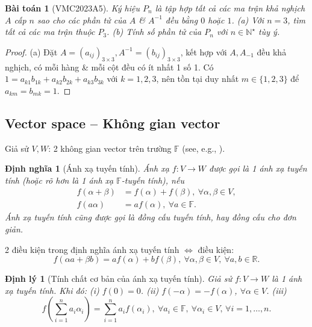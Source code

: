 \documentclass{article}
\newtheorem{baitoan}{Bài toán}
\newtheorem{dinhly}{Định lý}
\newtheorem{dinhnghia}{Định nghĩa}
\begin{document}
\begin{baitoan}[VMC2023A5]
	Ký hiệu $P_n$ là tập hợp tất cả các ma trận khả nghịch $A$ cấp $n$ sao cho các phần tử của $A$ \& $A^{-1}$ đều bằng $0$ hoặc $1$. (a) Với $n = 3$, tìm tất cả các ma trận thuộc $P_3$. (b) Tính số phần tử của $P_n$ với $n\in\mathbb{N}^\star$ tùy ý.
\end{baitoan}

\begin{proof}
	(a) Đặt $A = (a_{ij})_{3\times3},A^{-1} = (b_{ij})_{3\times3}$, kết hợp với $A,A_{-1}$ đều khả nghịch, có mỗi hàng \& mỗi cột đều có ít nhất 1 số 1. Có $1 = a_{k1}b_{1k} + a_{k2}b_{2k} + a_{k3}b_{3k}$ với $k = 1,2,3$, nên tồn tại duy nhất $m\in\{1,2,3\}$ để $a_{km} = b_{mk} = 1$.
\end{proof}


\subsection{Vector space -- Không gian vector}
Giả sử $V,W$: 2 không gian vector trên trường $\mathbb{F}$ (see, e.g., \cite[Chap. 2, \S2: Ánh xạ tuyến tính, pp. 100--110]{Hung_linear_algebra}).

\begin{dinhnghia}[Ánh xạ tuyến tính]
	Ánh xạ $f:V\to W$ được gọi là 1 \emph{ánh xạ tuyến tính} (hoặc rõ hơn là 1 \emph{ánh xạ $\mathbb{F}$-tuyến tính}), nếu
	\begin{align}
		f(\alpha + \beta) &= f(\alpha) + f(\beta),\ \forall\alpha,\beta\in V,\\
		f(a\alpha) &= af(\alpha),\ \forall a\in\mathbb{F}.
	\end{align}
	Ánh xạ tuyến tính cũng được gọi là \emph{đồng cấu tuyến tính}, hay \emph{đồng cấu} cho đơn giản.
\end{dinhnghia}
2 điều kiện trong định nghĩa ánh xạ tuyến tính $\Leftrightarrow$ điều kiện:
\begin{equation}
	f(\alpha a + \beta b) = af(\alpha) + bf(\beta),\ \forall\alpha,\beta\in V,\ \forall a,b\in\mathbb{R}.
\end{equation}

\begin{dinhly}[Tính chất cơ bản của ánh xạ tuyến tính]
	Giả sử $f:V\to W$ là 1 ánh xạ tuyến tính. Khi đó: (i) $f(0) = 0$. (ii) $f(-\alpha) = -f(\alpha)$, $\forall\alpha\in V$. (iii)
	\begin{equation}
		f\left(\sum_{i=1}^n a_i\alpha_i\right) = \sum_{i=1}^n a_if(\alpha_i),\ \forall a_i\in\mathbb{F},\ \forall\alpha_i\in V,\,\forall i = 1,\ldots,n.
	\end{equation}
\end{dinhly}
\end{document}
